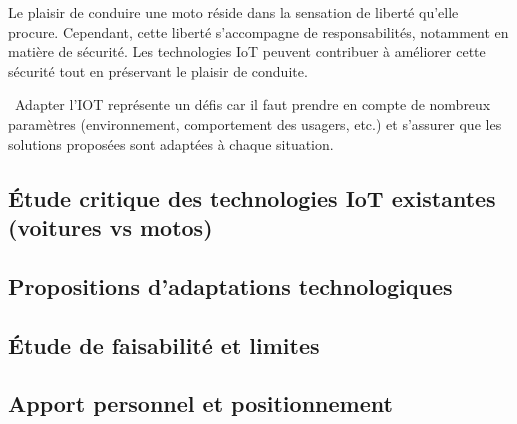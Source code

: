 \vspace{0.5cm}
Le plaisir de conduire une moto réside dans la sensation de liberté qu'elle procure. Cependant, cette liberté s'accompagne de responsabilités, notamment en matière de sécurité. Les technologies IoT peuvent contribuer à améliorer cette sécurité tout en préservant le plaisir de conduite.

\vspace{0.5cm}
\
Adapter l'IOT représente un défis car il faut prendre en compte de nombreux paramètres (environnement, comportement des usagers, etc.) et s'assurer que les solutions proposées sont adaptées à chaque situation.

\newpage
\subsection{ Étude critique des technologies IoT existantes (voitures vs motos)}


\subsection{ Propositions d’adaptations technologiques}

\subsection{ Étude de faisabilité et limites}
\subsection{Apport personnel et positionnement}
